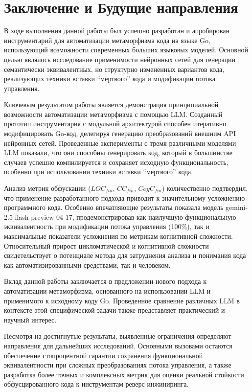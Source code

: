 \section{Заключение и Будущие направления}

В ходе выполнения данной работы был успешно разработан и апробирован инструментарий для автоматизации метаморфизма кода на языке Go, использующий возможности современных больших языковых моделей. Основной целью являлось исследование применимости нейронных сетей для генерации семантически эквивалентных, но структурно измененных вариантов кода, реализующих техники вставки \enquote{мертвого} кода и модификации потока управления.

Ключевым результатом работы является демонстрация принципиальной возможности автоматизации метаморфизма с помощью LLM. Созданный прототип инструментария с модульной архитектурой способен итеративно модифицировать Go-код, делегируя генерацию преобразований внешним API нейронных сетей. Проведенные эксперименты с тремя различными моделями LLM показали, что они способны генерировать код, который в большинстве случаев успешно компилируется и сохраняет исходную функциональность, особенно при использовании техники вставки \enquote{мертвого} кода.

Анализ метрик обфускации ($LOC_{fin}$, $CC_{fin}$, $CogC_{fin}$) количественно подтвердил, что применение разработанного подхода приводит к значительному усложнению программного кода. Особенно впечатляющие результаты показала модель gemini-2.5-flash-preview-04-17, продемонстрировав как наилучшую функциональную эквивалентность при модификации потока управления (100\%), так и максимальные показатели усложнения по метрикам когнитивной сложности. Относительный прирост цикломатической и когнитивной сложности свидетельствует о потенциале метода для затруднения анализа и понимания кода как автоматизированными средствами, так и человеком.

Вклад данной работы заключается в предложении нового подхода к автоматизации метаморфизма, основанного на использовании LLM и применимого к исходному коду Go. Проведенное сравнение различных LLM в контексте этой специфической задачи также представляет практический и научный интерес.

Несмотря на достигнутые результаты, выявленные ограничения определяют направления для дальнейших исследований. Основными вызовами остаются обеспечение стопроцентной гарантии сохранения функциональной эквивалентности при сложных преобразованиях потока управления, а также разработка более точных и комплексных метрик для оценки реальной стойкости обфусцированного кода к инструментам реверс-инжиниринга.

